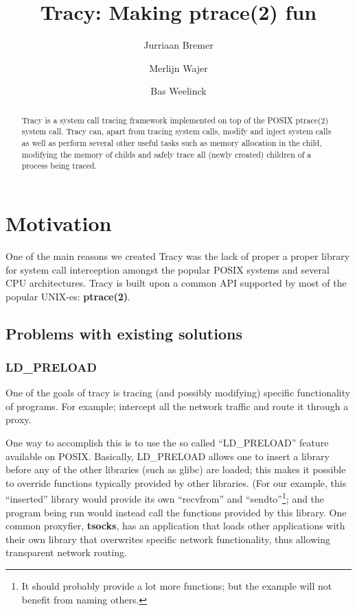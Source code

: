 \documentclass[a4paper, twoside, 10pt, twocolumn]{report}
\author{Jurriaan Bremer \and Merlijn Wajer \and Bas Weelinck}
\title{Tracy: Making ptrace(2) fun} %
\begin{document}
\maketitle

\begin{abstract}
    Tracy is a system call tracing framework implemented on top of the POSIX
    ptrace(2) system call.
    Tracy can, apart from tracing system calls, modify and inject system calls
    as well as perform several other useful tasks such as memory allocation in
    the child, modifying the memory of childs and safely trace all
    (newly created) children of a process being traced.
\end{abstract}

\tableofcontents


%
\chapter{Motivation}

One of the main reasons we created Tracy was the lack of proper a proper library
for system call interception amongst the popular POSIX systems and several
CPU architectures. Tracy is built upon a common API supported by most of the
popular UNIX-es: \textbf{ptrace(2)}.

\section{Problems with existing solutions}

\subsection{LD\_PRELOAD}
One of the goals of tracy is tracing (and possibly modifying) specific
functionality of programs. For example; intercept all the network traffic and
route it through a proxy. %

One way to accomplish this is to use the so called ``LD\_PRELOAD'' feature
available on POSIX. Basically, LD\_PRELOAD allows one to insert a library before
any of the other libraries (such as glibc) are loaded; this makes it possible to
override functions typically provided by other libraries. (For our example, this
``inserted'' library would provide its own ``recvfrom'' and
``sendto''\footnote{It should probably provide a lot more functions; but
the example will not benefit from naming others.}; and the program being run
would instead call the functions provided by this library. One common proxyfier,
\textbf{tsocks}, has an application that loads other applications with their own
library that overwrites specific network functionality, thus allowing
transparent network routing.
\end{document}
